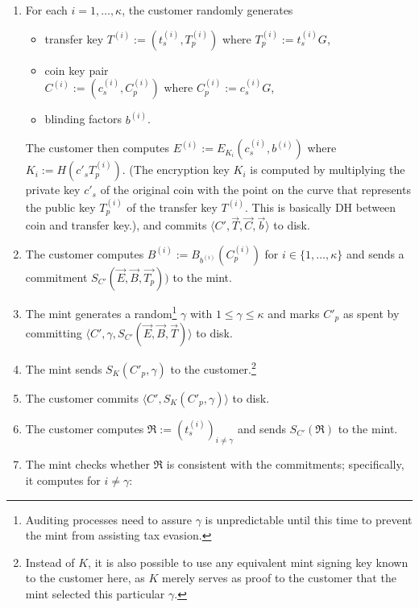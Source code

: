 \documentclass{llncs}
\begin{document}
\begin{enumerate}
  \item For each $i = 1,\ldots,\kappa$, the customer randomly generates
    \begin{itemize}
      \item transfer key $T^{(i)} := \left(t^{(i)}_s,T^{(i)}_p\right)$ where $T^{(i)}_p := t^{(i)}_s G$,
      \item coin key pair \\ $C^{(i)} := \left(c_s^{(i)}, C_p^{(i)}\right)$ where $C^{(i)}_p := c^{(i)}_s G$,
      \item blinding factors $b^{(i)}$.
    \end{itemize}
    The customer then computes $E^{(i)} := E_{K_i}\left(c_s^{(i)}, b^{(i)}\right)$ where $K_i := H(c'_s T_p^{(i)})$. (The encryption key $K_i$ is
    computed by multiplying the private key $c'_s$ of the original coin with the point on the curve
    that represents the public key $T^{(i)}_p$ of the transfer key $T^{(i)}$. This is basically DH between coin and transfer key.),
    and commits $\langle C', \vec{T}, \vec{C}, \vec{b} \rangle$ to disk.
  \item The customer computes $B^{(i)} := B_{b^{(i)}}(C^{(i)}_p)$  for $i \in \{1,\ldots,\kappa\}$ and sends a commitment
    $S_{C'}(\vec{E}, \vec{B}, \vec{T_p}))$ to the mint.
  \item The mint generates a random\footnote{Auditing processes need to assure $\gamma$ is unpredictable until this time to
    prevent the mint from assisting tax evasion.} $\gamma$ with $1 \le \gamma \le \kappa$ and
    marks $C'_p$ as spent by committing
    $\langle C', \gamma, S_{C'}(\vec{E}, \vec{B}, \vec{T}) \rangle$ to disk.
  \item The mint sends $S_K(C'_p, \gamma)$ to the customer.\footnote{Instead of $K$, it is also
    possible to use any equivalent mint signing key known to the customer here, as $K$ merely
    serves as proof to the customer that the mint selected this particular $\gamma$.}
  \item The customer commits $\langle C', S_K(C'_p, \gamma) \rangle$ to disk.
  \item The customer computes $\mathfrak{R} := \left(t_s^{(i)}\right)_{i \ne \gamma}$
        and sends $S_{C'}(\mathfrak{R})$ to the mint.
  \item \label{step:refresh-ccheck} The mint checks whether $\mathfrak{R}$ is consistent with the commitments;
    specifically, it computes for $i \not= \gamma$:


\end{enumerate}
\end{document}
